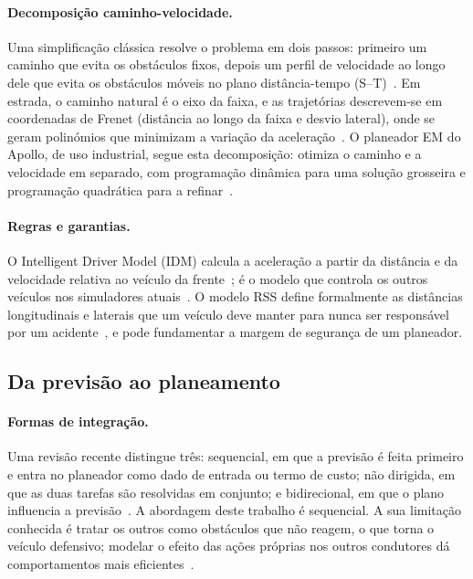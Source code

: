 \paragraph{Decomposição caminho-velocidade.}
Uma simplificação clássica resolve o problema em dois passos: primeiro
um caminho que evita os obstáculos fixos, depois um perfil de velocidade
ao longo dele que evita os obstáculos móveis no plano distância-tempo
(S--T)~\cite{kant1986toward}. Em estrada, o caminho natural é o eixo da
faixa, e as trajetórias descrevem-se em coordenadas de Frenet (distância
ao longo da faixa e desvio lateral), onde se geram polinómios que
minimizam a variação da aceleração~\cite{werling2010optimal}. O planeador
EM do Apollo, de uso industrial, segue esta decomposição: otimiza o
caminho e a velocidade em separado, com programação dinâmica para uma
solução grosseira e programação quadrática para a
refinar~\cite{fan2018baidu}.

\paragraph{Regras e garantias.}
O Intelligent Driver Model (IDM) calcula a aceleração a partir da
distância e da velocidade relativa ao veículo da
frente~\cite{treiber2000congested}; é o modelo que controla os outros
veículos nos simuladores
atuais~\cite{karnchanachari2024towards,gulino2023waymax}. O modelo RSS define
formalmente as distâncias longitudinais e laterais que um veículo deve
manter para nunca ser responsável por um
acidente~\cite{shalevshwartz2017formal}, e pode fundamentar a margem de
segurança de um planeador.

\subsection{Da previsão ao planeamento}
\label{sec:integracao}

\paragraph{Formas de integração.}
Uma revisão recente distingue três: sequencial, em que a previsão é feita
primeiro e entra no planeador como dado de entrada ou termo de custo; não
dirigida, em que as duas tarefas são resolvidas em conjunto; e
bidirecional, em que o plano influencia a
previsão~\cite{hagedorn2025integration}. A abordagem deste trabalho é
sequencial. A sua limitação conhecida é tratar os outros como obstáculos
que não reagem, o que torna o veículo defensivo; modelar o efeito das
ações próprias nos outros condutores dá comportamentos mais
eficientes~\cite{sadigh2016planning}.

